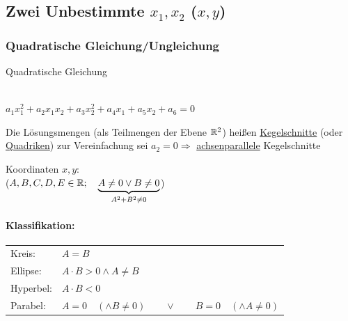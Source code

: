 \clearpage
\subsection{Zwei Unbestimmte $x_1,x_2$ ($x,y$)}
\subsubsection{Quadratische Gleichung/Ungleichung}
\begin{enumerate}[A)]
	{\bf \item Quadratische Gleichung}\\
	$a_1x_1^2+a_2x_1x_2+a_3x_2^2+a_4x_1+a_5x_2+a_6=0$
	
	Die Lösungsmengen (als Teilmengen der Ebene $\mathbb{R}^2$) heißen \ul{Kegelschnitte} (oder \ul{Quadriken}) zur Vereinfachung sei $a_2 = 0 \Rightarrow$ \ul{achsenparallele} Kegelschnitte
	
	Koordinaten $x,y$:\\
	 ($A,B,C,D,E \in\mathbb{R};\quad \underbrace{A\ne0 \lor B\ne0}_{A^2+B^2\ne0}$)
	
	\paragraph{Klassifikation:}
	\begin{tabular}{ll}
		Kreis: & $A=B$ \\
		Ellipse: & $A\cdot B > 0 \land A\ne B$ \\
		Hyperbel: & $A\cdot B < 0$ \\
		Parabel: & $A=0\quad (\land B\ne0) \qquad\lor\qquad B=0\quad (\land A\ne0)$\\
	\end{tabular}
	

\end{enumerate}
